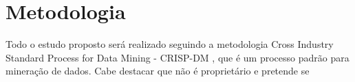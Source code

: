 \section{Metodologia}

Todo o estudo proposto será realizado seguindo a metodologia Cross Industry Standard Process for Data Mining - CRISP-DM \cite{chapman2000crisp}, que é um processo padrão para mineração de dados.  Cabe destacar que não é proprietário e pretende se